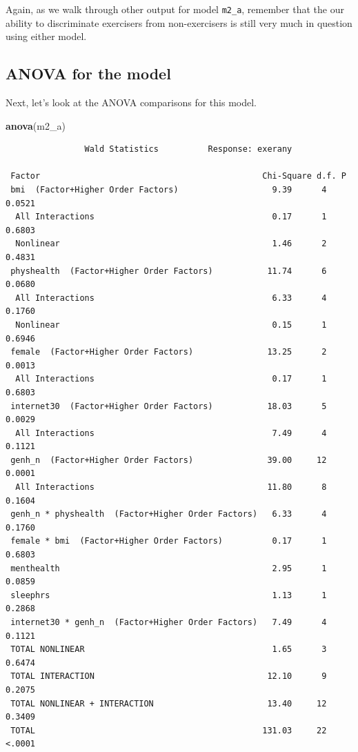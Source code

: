 \documentclass[]{book}
\newenvironment{Shaded}{\begin{snugshade}}{\end{snugshade}}
\newcommand{\KeywordTok}[1]{\textcolor[rgb]{0.13,0.29,0.53}{\textbf{#1}}}
\newcommand{\NormalTok}[1]{#1}
\theoremstyle{definition}
\theoremstyle{definition}
\theoremstyle{definition}
\theoremstyle{remark}
\begin{document}
Again, as we walk through other output for model \texttt{m2\_a},
remember that the our ability to discriminate exercisers from
non-exercisers is still very much in question using either model.

\subsection{ANOVA for the model}\label{anova-for-the-model-1}

Next, let's look at the ANOVA comparisons for this model.

\begin{Shaded}
\begin{Highlighting}[]
\KeywordTok{anova}\NormalTok{(m2_a)}
\end{Highlighting}
\end{Shaded}

\begin{verbatim}
                Wald Statistics          Response: exerany 

 Factor                                             Chi-Square d.f. P     
 bmi  (Factor+Higher Order Factors)                   9.39      4   0.0521
  All Interactions                                    0.17      1   0.6803
  Nonlinear                                           1.46      2   0.4831
 physhealth  (Factor+Higher Order Factors)           11.74      6   0.0680
  All Interactions                                    6.33      4   0.1760
  Nonlinear                                           0.15      1   0.6946
 female  (Factor+Higher Order Factors)               13.25      2   0.0013
  All Interactions                                    0.17      1   0.6803
 internet30  (Factor+Higher Order Factors)           18.03      5   0.0029
  All Interactions                                    7.49      4   0.1121
 genh_n  (Factor+Higher Order Factors)               39.00     12   0.0001
  All Interactions                                   11.80      8   0.1604
 genh_n * physhealth  (Factor+Higher Order Factors)   6.33      4   0.1760
 female * bmi  (Factor+Higher Order Factors)          0.17      1   0.6803
 menthealth                                           2.95      1   0.0859
 sleephrs                                             1.13      1   0.2868
 internet30 * genh_n  (Factor+Higher Order Factors)   7.49      4   0.1121
 TOTAL NONLINEAR                                      1.65      3   0.6474
 TOTAL INTERACTION                                   12.10      9   0.2075
 TOTAL NONLINEAR + INTERACTION                       13.40     12   0.3409
 TOTAL                                              131.03     22   <.0001
\end{verbatim}
\end{document}
